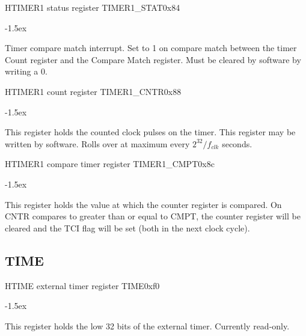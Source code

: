 \documentclass[12pt]{article}
\begin{document}
\begin{register}{H}{TIMER1 status register TIMER1\_STAT}{0x84}
\label{timer1stat}
%
%
%
\regnewline%
\end{register}
\begin{regdesc}[0.8\textwidth]\begin{reglist}[0000]
\itemsep-1.5ex
\item[TCI] Timer compare match interrupt. Set to 1 on compare match between the timer Count register and the Compare Match register. Must be cleared by software by writing a 0.
\end{reglist}\end{regdesc}

\begin{register}{H}{TIMER1 count register TIMER1\_CNTR}{0x88}
\label{timer1cntr}
%
\regnewline%
\end{register}
\begin{regdesc}[0.8\textwidth]\begin{reglist}[0000]
\itemsep-1.5ex
\item[CNTR] This register holds the counted clock pulses on the timer. This register may be written by software. Rolls over at maximum every $2^{32}/f_{clk}$ seconds.
\end{reglist}\end{regdesc}

\begin{register}{H}{TIMER1 compare timer register TIMER1\_CMPT}{0x8c}
\label{timer1cmpt}
%
\regnewline%
\end{register}
\begin{regdesc}[0.8\textwidth]\begin{reglist}[0000]
\itemsep-1.5ex
\item[CMPT] This register holds the value at which the counter register is compared. On CNTR compares to greater than or equal to CMPT, the counter register will be cleared and the TCI flag will be set (both in the next clock cycle).
\end{reglist}\end{regdesc}

\subsection{TIME}
\begin{register}{H}{TIME external timer register TIME}{0xf0}
\label{time}
%
\regnewline%
\end{register}
\begin{regdesc}[0.8\textwidth]\begin{reglist}[0000]
\itemsep-1.5ex
\item This register holds the low 32 bits of the external timer. Currently read-only.
\end{reglist}\end{regdesc}
\end{document}
